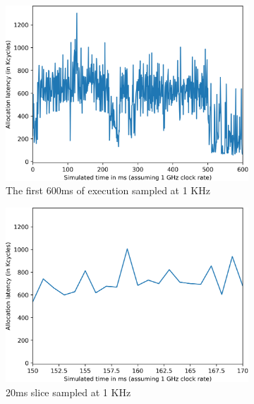 
\begin{figure}
	\centering
	\begin{subfigure}[t]{0.32\textwidth}
		\includegraphics[width=\textwidth]{results/java-alloc-macro.png}
		\caption{The first 600ms of execution sampled at 1 KHz}
	\end{subfigure}
	\begin{subfigure}[t]{0.32\textwidth}
		\includegraphics[width=\textwidth]{results/java-alloc-1khz.png}
		\caption{20ms slice sampled at 1 KHz}
	\end{subfigure}
	\begin{subfigure}[t]{0.32\textwidth}

\end{subfigure}
\end{figure}
